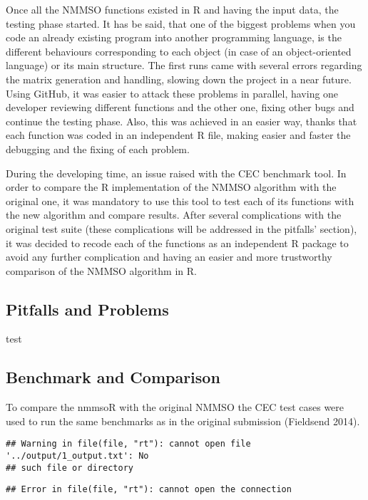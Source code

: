 \documentclass[12pt,a4paper]{article}
\begin{document}
Once all the NMMSO functions existed in R and having the input data, the
testing phase started. It has be said, that one of the biggest problems
when you code an already existing program into another programming
language, is the different behaviours corresponding to each object (in
case of an object-oriented language) or its main structure. The first
runs came with several errors regarding the matrix generation and
handling, slowing down the project in a near future. Using GitHub, it
was easier to attack these problems in parallel, having one developer
reviewing different functions and the other one, fixing other bugs and
continue the testing phase. Also, this was achieved in an easier way,
thanks that each function was coded in an independent R file, making
easier and faster the debugging and the fixing of each problem.

During the developing time, an issue raised with the CEC benchmark tool.
In order to compare the R implementation of the NMMSO algorithm with the
original one, it was mandatory to use this tool to test each of its
functions with the new algorithm and compare results. After several
complications with the original test suite (these complications will be
addressed in the pitfalls' section), it was decided to recode each of
the functions as an independent R package to avoid any further
complication and having an easier and more trustworthy comparison of the
NMMSO algorithm in R.

\subsection{Pitfalls and Problems}\label{pitfalls-and-problems}

test

\subsection{Benchmark and Comparison}\label{benchmark-and-comparison}

To compare the nmmsoR with the original NMMSO the CEC test cases were
used to run the same benchmarks as in the original submission (Fieldsend
2014).

\begin{verbatim}
## Warning in file(file, "rt"): cannot open file '../output/1_output.txt': No
## such file or directory
\end{verbatim}

\begin{verbatim}
## Error in file(file, "rt"): cannot open the connection
\end{verbatim}
\end{document}
